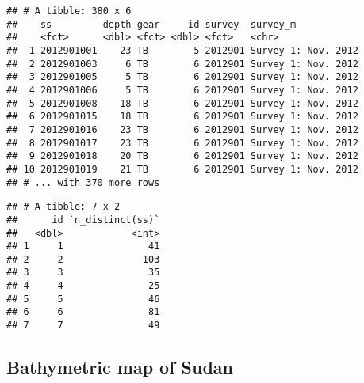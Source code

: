 \documentclass[]{article}
\newenvironment{Shaded}{\begin{snugshade}}{\end{snugshade}}
\newcommand{\KeywordTok}[1]{\textcolor[rgb]{0.13,0.29,0.53}{\textbf{#1}}}
\newcommand{\StringTok}[1]{\textcolor[rgb]{0.31,0.60,0.02}{#1}}
\newcommand{\OperatorTok}[1]{\textcolor[rgb]{0.81,0.36,0.00}{\textbf{#1}}}
\newcommand{\NormalTok}[1]{#1}
\begin{document}
\begin{verbatim}
## # A tibble: 380 x 6
##    ss         depth gear     id survey  survey_m           
##    <fct>      <dbl> <fct> <dbl> <fct>   <chr>              
##  1 2012901001    23 TB        5 2012901 Survey 1: Nov. 2012
##  2 2012901003     6 TB        6 2012901 Survey 1: Nov. 2012
##  3 2012901005     5 TB        6 2012901 Survey 1: Nov. 2012
##  4 2012901006     5 TB        6 2012901 Survey 1: Nov. 2012
##  5 2012901008    18 TB        6 2012901 Survey 1: Nov. 2012
##  6 2012901015    18 TB        6 2012901 Survey 1: Nov. 2012
##  7 2012901016    23 TB        6 2012901 Survey 1: Nov. 2012
##  8 2012901017    23 TB        6 2012901 Survey 1: Nov. 2012
##  9 2012901018    20 TB        6 2012901 Survey 1: Nov. 2012
## 10 2012901019    21 TB        6 2012901 Survey 1: Nov. 2012
## # ... with 370 more rows
\end{verbatim}

\begin{Shaded}
\end{Shaded}

\begin{verbatim}
## # A tibble: 7 x 2
##      id `n_distinct(ss)`
##   <dbl>            <int>
## 1     1               41
## 2     2              103
## 3     3               35
## 4     4               25
## 5     5               46
## 6     6               81
## 7     7               49
\end{verbatim}

\begin{Shaded}
\end{Shaded}

\subsection{Bathymetric map of Sudan}\label{bathymetric-map-of-sudan}
\end{document}
